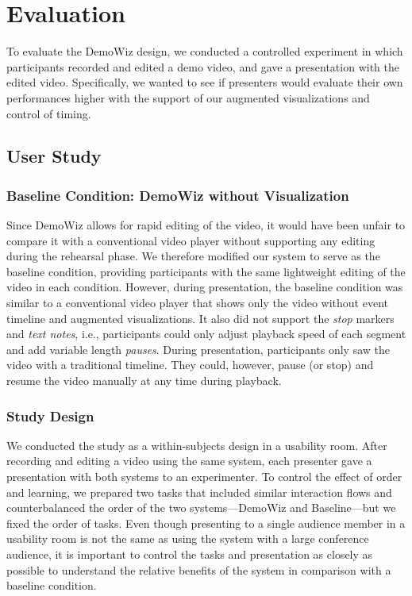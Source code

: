 \section{Evaluation}
To evaluate the DemoWiz design, we conducted a controlled experiment in which participants recorded and edited a demo video, and gave a presentation with the edited video. Specifically, we wanted to see if presenters would evaluate their own performances higher with the support of our augmented visualizations and control of timing.

\subsection{User Study}

\subsubsection{Baseline Condition: DemoWiz without Visualization}
Since DemoWiz allows for rapid editing of the video, it would have been unfair to compare it with a conventional video player without supporting any editing during the rehearsal phase. We therefore modified our system to serve as the baseline condition, providing participants with the same lightweight editing of the video in each condition. However, during presentation, the baseline condition was similar to a conventional video player that shows only the video without event timeline and augmented visualizations. It also did not support the \textit{stop} markers and \textit{text notes}, i.e., participants could only adjust playback speed of each segment and add variable length \textit{pauses}. During presentation, participants only saw the video with a traditional timeline. They could, however, pause (or stop) and resume the video manually at any time during playback.

\subsubsection{Study Design}
We conducted the study as a within-subjects design in a usability room. After recording and editing a video using the same system, each presenter gave a presentation with both systems to an experimenter. To control the effect of order and learning, we prepared two tasks that included similar interaction flows and counterbalanced the order of the two systems—DemoWiz and Baseline—but we fixed the order of tasks. Even though presenting to a single audience member in a usability room is not the same as using the system with a large conference audience, it is important to control the tasks and presentation as closely as possible to understand the relative benefits of the system in comparison with a baseline condition.

